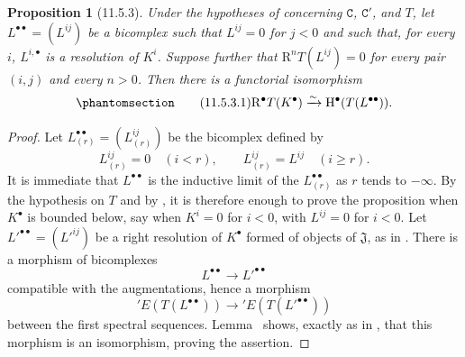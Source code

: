 \documentclass[oneside]{amsart}
\theoremstyle{ega-env-style}
\theoremstyle{ega-thm-env-style}
\newtheorem*{proposition}{Proposition}
\theoremstyle{ega-defn-env-style}
\def\cat{\mathtt}                   %
\def\geq{\geqslant}                 %
\def\HH{\mathrm{H}}                 %
\def\RR{\mathrm{R}}                 %
\def\simto{\xrightarrow{\sim}}
\let\EGAOriginalLabel\label
\renewcommand{\label}[1]{\phantomsection\EGAOriginalLabel{#1}}
\begin{document}
\begin{proposition}[11.5.3]
\label{0.11.5.3}
Under the hypotheses of  concerning $\cat{C}$, $\cat{C}'$, and $T$, let $L^{\bullet\bullet}=(L^{ij})$ be a bicomplex such that $L^{ij}=0$ for $j<0$ and such that, for every $i$, $L^{i,\bullet}$ is a resolution of $K^i$.
Suppose further that $\RR^nT(L^{ij})=0$ for every pair $(i,j)$ and every $n>0$.
Then there is a functorial isomorphism
\[
\label{0.11.5.3.1}
\tag{11.5.3.1}
  \RR^\bullet T(K^\bullet)
  \simto
  \HH^\bullet(T(L^{\bullet\bullet})).
\]
\end{proposition}

\begin{proof}
Let $L^{\bullet\bullet}_{(r)}=(L^{ij}_{(r)})$ be the bicomplex defined by
\[
  L^{ij}_{(r)}=0\quad(i<r),\qquad
  L^{ij}_{(r)}=L^{ij}\quad(i\geq r).
\]
It is immediate that $L^{\bullet\bullet}$ is the inductive limit of the $L^{\bullet\bullet}_{(r)}$ as $r$ tends to $-\infty$.
By the hypothesis on $T$ and by , it is therefore enough to prove the proposition when $K^\bullet$ is bounded below, say when $K^i=0$ for $i<0$, with $L^{ij}=0$ for $i<0$.
Let $L'^{\bullet\bullet}=(L'^{ij})$ be a right resolution of $K^\bullet$ formed of objects of $\mathfrak{J}$, as in .
There is a morphism of bicomplexes
\[
  L^{\bullet\bullet}\longrightarrow L'^{\bullet\bullet}
\]
compatible with the augmentations, hence a morphism
\[
  'E(T(L^{\bullet\bullet}))\longrightarrow{}'E(T(L'^{\bullet\bullet}))
\]
between the first spectral sequences.
Lemma~ shows, exactly as in , that this morphism is an isomorphism, proving the assertion.
\end{proof}
\end{document}

